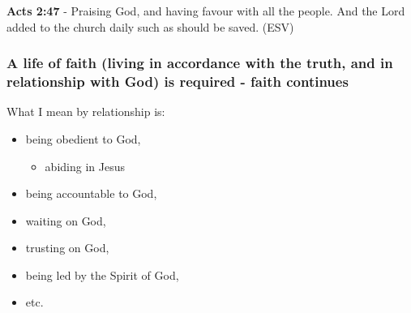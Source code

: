 \documentclass[11pt]{article}
\begin{document}
\textbf{Acts 2:47} - Praising God, and having favour with all the people. And the Lord added to the church daily such as should be saved. (ESV)

\subsubsection{A life of faith (living in accordance with the truth, and in relationship with God) is required - faith continues}
\label{sec:org3e85e6b}
What I mean by relationship is:
\begin{itemize}
\item being obedient to God,
\begin{itemize}
\item abiding in Jesus
\end{itemize}
\item being accountable to God,
\item waiting on God,
\item trusting on God,
\item being led by the Spirit of God,
\item etc.
\end{itemize}
\end{document}
